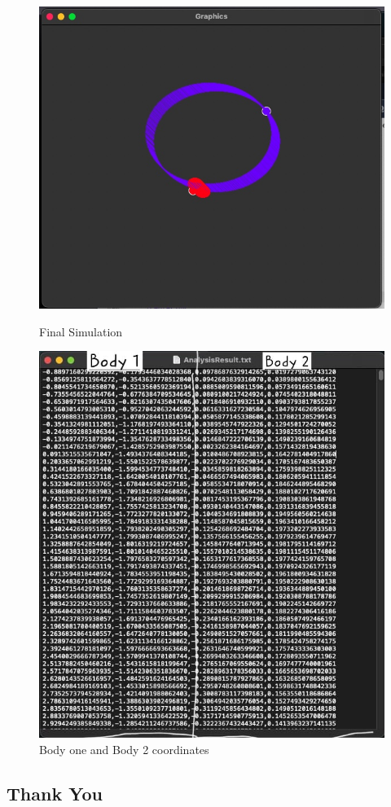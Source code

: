 \documentclass{article}
\begin{document}
\begin{figure}[htbp]

    \centering
    \includegraphics[width=0.5\linewidth]{Image 20-04-24 at 10.31 PM.jpg}
    
    \caption{Final Simulation}
    \label{fig:final-simulation}

    \centering
    \includegraphics[width=0.5\linewidth]{WhatsApp Image 2024-04-20 at 22.24.56 (1).jpeg}
    \caption{Body one and Body 2 coordinates}
    \label{fig:enter-label}
\end{figure}
\vspace*{\fill}
\begin{center}
\subsection*{\large Thank You}
\end{center}
\vspace*{\fill}
\end{document}
